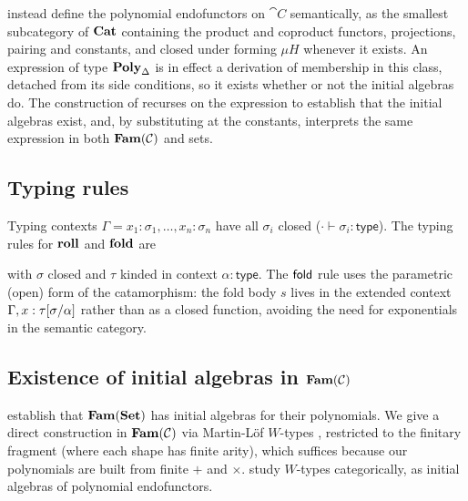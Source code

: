 \citet[Definition~6]{nunes2023} instead define the polynomial endofunctors on $\cat{C}$
semantically, as the smallest subcategory of $\mathbf{Cat}$ containing the product and coproduct functors,
projections, pairing and constants, and closed under forming $\mu H$ whenever it exists. An expression
of type $\mathbf{Poly}_\Delta$ is in effect a derivation of membership in this class, detached from its side
conditions, so it exists whether or not the initial algebras do. The construction of
 recurses on the expression to establish that the initial algebras exist,
and, by substituting at the constants, interprets the same expression in both $\mathbf{Fam}(\mathcal{C})$ and sets.

\subsection{Typing rules}
\label{sec:polynomial-types:language}

Typing contexts $\Gamma = x_1 : \sigma_1, \ldots, x_n : \sigma_n$ have all $\sigma_i$ closed
($\cdot \vdash \sigma_i : \mathsf{type}$). The typing rules for $\mathbf{roll}$ and $\mathbf{fold}$ are
with $\sigma$ closed and $\tau$ kinded in context $\alpha : \mathsf{type}$. The $\mathsf{fold}$ rule uses the
parametric (open) form of the catamorphism: the fold body $s$ lives in the extended context $\Gamma, x :
\tau[\sigma/\alpha]$ rather than as a closed function, avoiding the need for exponentials in the
semantic category.

\subsection{Existence of initial algebras in $\mathbf{Fam}(\mathcal{C})$}
\label{sec:polynomial-types:fam}

\citet[Proposition~81]{nunes2023} establish that $\mathbf{Fam}(\mathbf{Set})$ has initial algebras for their polynomials. We
give a direct construction in $\mathbf{Fam}(\mathcal{C})$ via Martin-L\"of $W$-types
\citep[Wellorderings, pp.~43--47]{martinLof1984}, restricted to the finitary fragment (where each shape has
finite arity), which suffices because our polynomials are built from finite $+$ and $\times$.
\citet{moerdijk-palmgren00} study $W$-types categorically, as initial algebras of polynomial
endofunctors.

